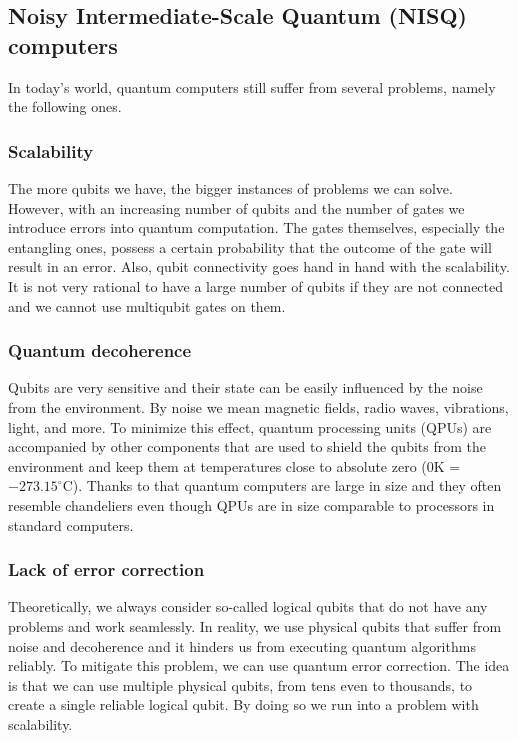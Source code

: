 \subsection*{Noisy Intermediate-Scale Quantum (NISQ) computers}
In today's world, quantum computers still suffer from several problems, namely the following ones.

\subsubsection{Scalability}
The more qubits we have, the bigger instances of problems we can solve. However, with an increasing number of qubits and the number of gates we introduce errors into quantum computation. The gates themselves, especially the entangling ones, possess a certain probability that the outcome of the gate will result in an error. Also, qubit connectivity goes hand in hand with the scalability. It is not very rational to have a large number of qubits if they are not connected and we cannot use multiqubit gates on them.

\subsubsection{Quantum decoherence}
Qubits are very sensitive and their state can be easily influenced by the noise from the environment. By noise we mean magnetic fields, radio waves, vibrations, light, and more. To minimize this effect, quantum processing units (QPUs) are accompanied by other components that are used to shield the qubits from the environment and keep them at temperatures close to absolute zero ($0$K = $-273.15^{\circ}$C). Thanks to that quantum computers are large in size and they often resemble chandeliers even though QPUs are in size comparable to processors in standard computers.

\subsubsection{Lack of error correction}
Theoretically, we always consider so-called logical qubits that do not have any problems and work seamlessly. In reality, we use physical qubits that suffer from noise and decoherence and it hinders us from executing quantum algorithms reliably. To mitigate this problem, we can use quantum error correction. The idea is that we can use multiple physical qubits, from tens even to thousands, to create a single reliable logical qubit. By doing so we run into a problem with scalability. 

